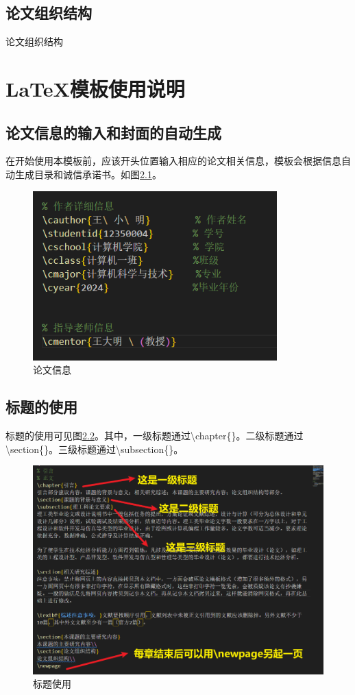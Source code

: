 ﻿\documentclass{scutthesis} %
\begin{document}
\section{论文组织结构}
论文组织结构\\
\newpage

\chapter{\LaTeX 模板使用说明}
\section{论文信息的输入和封面的自动生成}
在开始使用本模板前，应该开头位置输入相应的论文相关信息，模板会根据信息自动生成目录和诚信承诺书。如图\ref{author}。
\begin{figure}[htbp]
        \centering
        \includegraphics[height=6.54cm]{image/作者信息.png}
        \caption{论文信息}
        \label{author}
\end{figure}

\section{标题的使用}
标题的使用可见图\ref{til}。其中，一级标题通过\textbackslash chapter\{\}。二级标题通过 \textbackslash section\{\}。三级标题通过\textbackslash subsection\{\}。
\begin{figure}[htbp]
        \centering
        \includegraphics[width=0.65\linewidth]{image/标题使用.png}
        \caption{标题使用}
        \label{til}
\end{figure}
\end{document}
